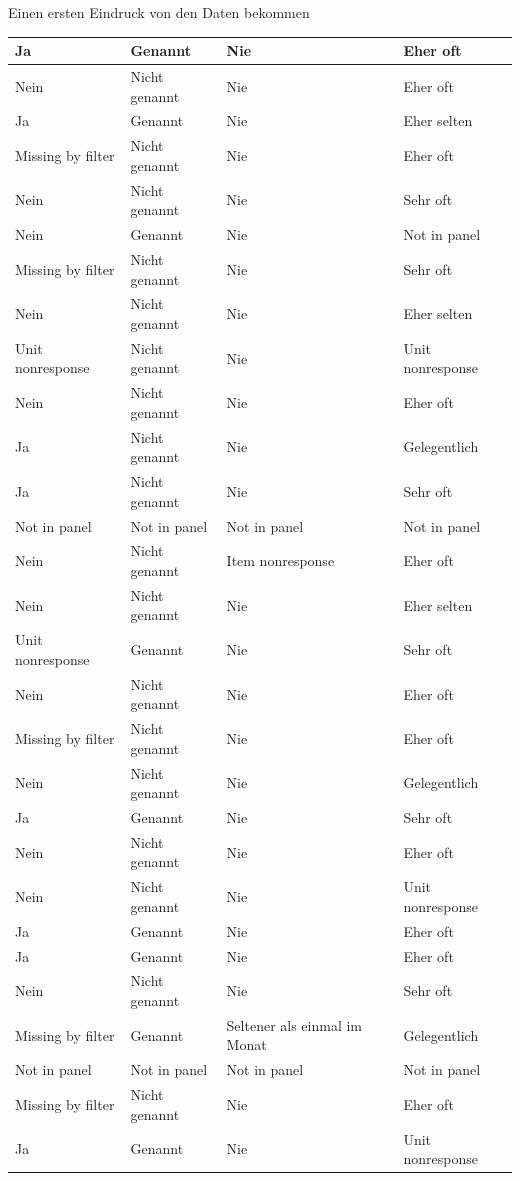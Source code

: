 \documentclass[ignorenonframetext,]{beamer}
\begin{document}
\begin{frame}{Einen ersten Eindruck von den Daten bekommen}
\begin{tabular}{l|l|l|l}
\hline
Ja & Genannt & Nie & Eher oft\\
\hline
Nein & Nicht genannt & Nie & Eher oft\\
\hline
Ja & Genannt & Nie & Eher selten\\
\hline
Missing by filter & Nicht genannt & Nie & Eher oft\\
\hline
Nein & Nicht genannt & Nie & Sehr oft\\
\hline
Nein & Genannt & Nie & Not in panel\\
\hline
Missing by filter & Nicht genannt & Nie & Sehr oft\\
\hline
Nein & Nicht genannt & Nie & Eher selten\\
\hline
Unit nonresponse & Nicht genannt & Nie & Unit nonresponse\\
\hline
Nein & Nicht genannt & Nie & Eher oft\\
\hline
Ja & Nicht genannt & Nie & Gelegentlich\\
\hline
Ja & Nicht genannt & Nie & Sehr oft\\
\hline
Not in panel & Not in panel & Not in panel & Not in panel\\
\hline
Nein & Nicht genannt & Item nonresponse & Eher oft\\
\hline
Nein & Nicht genannt & Nie & Eher selten\\
\hline
Unit nonresponse & Genannt & Nie & Sehr oft\\
\hline
Nein & Nicht genannt & Nie & Eher oft\\
\hline
Missing by filter & Nicht genannt & Nie & Eher oft\\
\hline
Nein & Nicht genannt & Nie & Gelegentlich\\
\hline
Ja & Genannt & Nie & Sehr oft\\
\hline
Nein & Nicht genannt & Nie & Eher oft\\
\hline
Nein & Nicht genannt & Nie & Unit nonresponse\\
\hline
Ja & Genannt & Nie & Eher oft\\
\hline
Ja & Genannt & Nie & Eher oft\\
\hline
Nein & Nicht genannt & Nie & Sehr oft\\
\hline
Missing by filter & Genannt & Seltener als einmal im Monat & Gelegentlich\\
\hline
Not in panel & Not in panel & Not in panel & Not in panel\\
\hline
Missing by filter & Nicht genannt & Nie & Eher oft\\
\hline
Ja & Genannt & Nie & Unit nonresponse\\

\end{tabular}
\end{frame}
\end{document}
